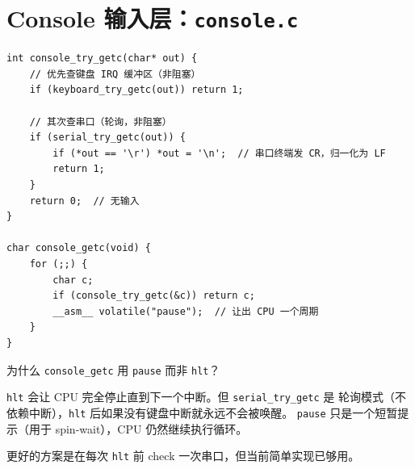 \section{Console 输入层：\texttt{console.c}}

\begin{lstlisting}[style=cstyle]
int console_try_getc(char* out) {
    // 优先查键盘 IRQ 缓冲区（非阻塞）
    if (keyboard_try_getc(out)) return 1;

    // 其次查串口（轮询，非阻塞）
    if (serial_try_getc(out)) {
        if (*out == '\r') *out = '\n';  // 串口终端发 CR，归一化为 LF
        return 1;
    }
    return 0;  // 无输入
}

char console_getc(void) {
    for (;;) {
        char c;
        if (console_try_getc(&c)) return c;
        __asm__ volatile("pause");  // 让出 CPU 一个周期
    }
}
\end{lstlisting}

\begin{whybox}
为什么 \texttt{console\_getc} 用 \texttt{pause} 而非 \texttt{hlt}？

\texttt{hlt} 会让 CPU 完全停止直到下一个中断。但 \texttt{serial\_try\_getc} 是
轮询模式（不依赖中断），\texttt{hlt} 后如果没有键盘中断就永远不会被唤醒。
\texttt{pause} 只是一个短暂提示（用于 spin-wait），CPU 仍然继续执行循环。

更好的方案是在每次 \texttt{hlt} 前 check 一次串口，但当前简单实现已够用。
\end{whybox}



